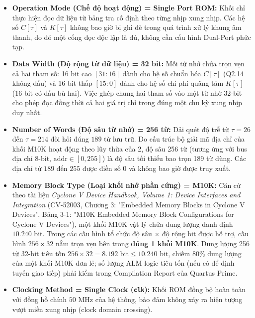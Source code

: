 \begin{itemize}[leftmargin=1.5em, itemsep=3pt]
    \item \textbf{Operation Mode (Chế độ hoạt động) = Single Port ROM:} 
    Khối chỉ thực hiện đọc dữ liệu từ bảng tra cố định theo từng nhịp xung nhịp. Các hệ số $C[\tau]$ và $K[\tau]$ không bao giờ bị ghi đè trong quá trình xử lý khung âm thanh, do đó một cổng đọc độc lập là đủ, không cần cấu hình Dual-Port phức tạp.

    \item \textbf{Data Width (Độ rộng từ dữ liệu) = 32 bit:}
    Mỗi từ nhớ chứa trọn vẹn cả hai tham số: 16 bit cao $[31:16]$ dành cho hệ số chuẩn hóa $C[\tau]$ (Q2.14 không dấu) và 16 bit thấp $[15:0]$ dành cho hệ số chi phí quãng tám $K[\tau]$ (16 bit có dấu bù hai). Việc ghép chung hai tham số vào một từ nhớ 32-bit cho phép đọc đồng thời cả hai giá trị chỉ trong đúng một chu kỳ xung nhịp duy nhất.

    \item \textbf{Number of Words (Độ sâu từ nhớ) = 256 từ:}
    Dải quét độ trễ từ $\tau = 26$ đến $\tau = 214$ đòi hỏi đúng $189\text{ từ}$ lưu trữ. Do cấu trúc bộ giải mã địa chỉ của khối M10K hoạt động theo lũy thừa của 2, độ sâu 256 từ (tương ứng với bus địa chỉ 8-bit, $\text{addr} \in [0, 255]$) là độ sâu tối thiểu bao trọn 189 từ dùng. Các địa chỉ từ $189$ đến $255$ được điền số 0 và không bao giờ được truy xuất.

    \item \textbf{Memory Block Type (Loại khối nhớ phần cứng) = M10K:}
    Căn cứ theo tài liệu \emph{Cyclone V Device Handbook, Volume 1: Device Interfaces and Integration} (CV-52003, Chương 3: "Embedded Memory Blocks in Cyclone V Devices", Bảng 3-1: "M10K Embedded Memory Block Configurations for Cyclone V Devices"), một khối M10K vật lý chứa dung lượng danh định $10.240\text{ bit}$. Trong các cấu hình tổ chức độ sâu $\times$ độ rộng bit được hỗ trợ, cấu hình $256 \times 32$ nằm trọn vẹn bên trong \textbf{đúng 1 khối M10K}. Dung lượng 256 từ 32-bit tiêu tốn $256 \times 32 = 8.192\text{ bit} \le 10.240\text{ bit}$, chiếm $80\%$ dung lượng của một khối M10K đơn lẻ; số lượng ALM logic tiêu tốn (nếu có để định tuyến giao tiếp) phải kiểm trong Compilation Report của Quartus Prime.

    \item \textbf{Clocking Method = Single Clock (\texttt{clk}):}
    Khối ROM đồng bộ hoàn toàn với đồng hồ chính $50\text{ MHz}$ của hệ thống, bảo đảm không xảy ra hiện tượng vượt miền xung nhịp (clock domain crossing).


\end{itemize}
